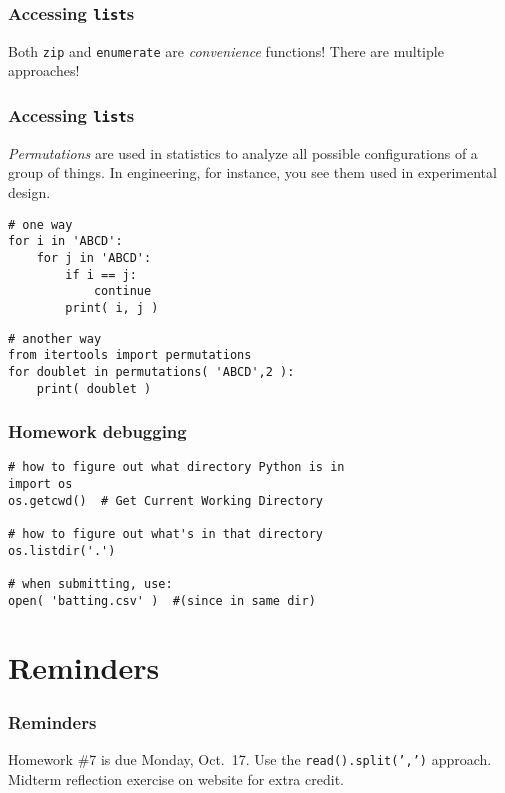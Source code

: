 \documentclass[11pt]{beamer}
\begin{document}
\begin{frame}[fragile]
  \frametitle{Accessing \texttt{list}s}
  \Enlarge

  \begin{enumerate}
  \myitem  Both \texttt{zip} and \texttt{enumerate} are \emph{convenience} functions!
  \myitem  There are multiple approaches!
  \end{enumerate}
\end{frame}

\begin{frame}[fragile]
  \frametitle{Accessing \texttt{list}s}

  \begin{enumerate}
  \myitem  \emph{Permutations} are used in statistics to analyze all possible configurations of a group of things.
  \myitem  In engineering, for instance, you see them used in experimental design.
  \end{enumerate}
  \begin{Verbatim}
# one way
for i in 'ABCD':
    for j in 'ABCD':
        if i == j:
            continue
        print( i, j )
  \end{Verbatim}
  \pause
  \begin{Verbatim}
# another way
from itertools import permutations
for doublet in permutations( 'ABCD',2 ):
    print( doublet )
  \end{Verbatim}
\end{frame}

\begin{frame}[fragile]
  \frametitle{Homework debugging}
  \Enlarge

  \begin{Verbatim}
# how to figure out what directory Python is in
import os
os.getcwd()  # Get Current Working Directory

# how to figure out what's in that directory
os.listdir('.')

# when submitting, use:
open( 'batting.csv' )  #(since in same dir)
  \end{Verbatim}
\end{frame}

\section{Reminders}

\begin{frame}
  \frametitle{Reminders}
  \Enlarge

  \begin{itemize}
  \myitem  Homework \#7 is due Monday, Oct.\ 17.
  \mysubitem  Use the \texttt{read().split(',')} approach.
  \myitem  Midterm reflection exercise on website for extra credit.
  \end{itemize}
\end{frame}
\end{document}
